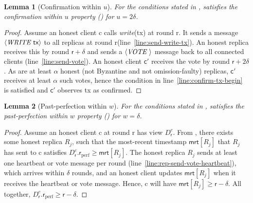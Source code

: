 \documentclass[pdflatex,sn-mathphys-num]{sn-jnl}%
\theoremstyle{thmstyleone}%
\theoremstyle{thmstyletwo}%
\theoremstyle{thmstylethree}%
\newtheorem{lemma}{Lemma}
\newcommand{\op}[1]{\textsl{#1}}
\newcommand{\opwrite}[1]{\op{write}(#1)\xspace}
\newcommand{\operand}[1]{\textsf{#1}}
\newcommand{\tx}{\operand{tx}\xspace}
\newcommand{\round}{\operand{r}\xspace}
\newcommand{\client}{\operand{c}\xspace}
\newcommand{\rperf}{\ensuremath{\round_\text{perf}}\xspace}
\newcommand{\rep}{\ensuremath{R}\xspace}
\newcommand{\mrt}{\operand{mrt}\xspace}
\newcommand{\parConf}{\ensuremath{u}\xspace}
\newcommand{\parPerf}{\ensuremath{w}\xspace}
\newcommand{\Pod}{\ensuremath{D}\xspace}
\newcommand{\podView}[2]{\ensuremath{\Pod_{#2}^{#1}}\xspace}
\newcommand{\confirmed}{confirmed\xspace}
\newcommand{\msg}[2]{\ensuremath{\langle\textit{\uppercase{#1 }}#2\rangle}\xspace}
\newcommand{\msgwrite}[1]{\msg{write}{ #1}}
\newcommand{\msgrecord}[1]{\msg{vote}{ #1}}
\let\oldalpha\alpha
\renewcommand{\alpha}{\ensuremath{\oldalpha}\xspace}
\begin{document}
\begin{appendices}
\begin{lemma}[Confirmation within $\parConf$]\label{lem:pod-confirmation}
	For the conditions stated in ,  satisfies the \emph{confirmation within $\parConf$} property () for $\parConf = 2 \delta$.
\end{lemma}
\begin{proof}
	Assume an honest client \client calls \opwrite{\tx} at round \round.
	It sends a message \msgwrite{\tx} to all replicas at round \round (line~\ref{line:send-write-tx}).
	An honest replica receives this by round $\round + \delta$ and sends a \msgrecord{} message back to all connected clients (line~\ref{line:send-vote}).
	An honest client $\client'$ receives the vote by round $\round + 2\delta$.
	As are at least \alpha honest (not Byzantine and not omission-faulty) replicas, $\client'$ receives at least \alpha such votes, hence the condition in line~\ref{line:confirm-tx-begin} is satisfied and $\client'$ observes \tx as \confirmed.
\end{proof}

\begin{lemma}[Past-perfection within $\parPerf$]\label{lem:past-perfection-liveness}
	For the conditions stated in ,  satisfies the \emph{past-perfection within $\parPerf$} property () for $\parPerf = \delta$.
\end{lemma}
\begin{proof}
	Assume an honest client \client at round \round has view $\podView{c}{\round}$.
	From , there exists some honest replica $\rep_j$, such that the most-recent timestamp $\mrt[\rep_j]$ that $\rep_j$ has sent to \client satisfies $\podView{c}{\round}.\rperf \geq \mrt[\rep_j]$.
	The honest replica $\rep_j$ sends at least one heartbeat or vote message per round (line~\ref{line:rep-send-vote-heartbeat}), which arrives within $\delta$ rounds, and an honest client updates $\mrt[\rep_j]$ when it receives the heartbeat or vote message.
	Hence, \client will have $\mrt[\rep_j] \geq \round - \delta$.
	All together, $\podView{c}{\round}.\rperf \geq \round - \delta$.
\end{proof}


\end{appendices}
\end{document}
